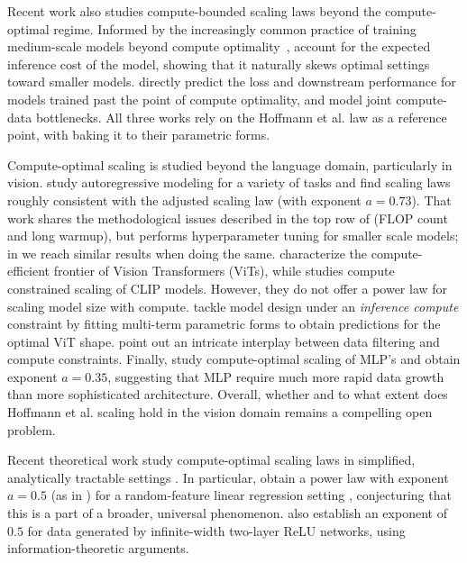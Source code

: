 \documentclass{article}
\makeatletter
\theoremstyle{plain}
\theoremstyle{definition}
\theoremstyle{remark}
\newcommand{\Hoffmann}{Hoffmann et al.\@\xspace}
\newcommand{\nExp}{a}
\makeatother
\begin{document}
{Recent work also studies compute-bounded scaling laws beyond the compute-optimal regime. Informed by the increasingly common practice of training medium-scale models beyond compute optimality~\citep[e.g., ][]{touvron2023llama,touvron2023llama2,jiang2023mistral}, \citet{sardana2023beyond} account for the expected inference cost of the model, showing that it naturally skews optimal settings toward smaller models. \citet{gadre2024language} directly predict the loss and downstream performance for models trained past the point of compute optimality, and \citet{muennighoff2024scaling} model joint compute-data bottlenecks. All three works  rely on the \Hoffmann law as a reference point, with \cite{gadre2024language,muennighoff2024scaling} baking it to their parametric forms. 

Compute-optimal scaling is studied beyond the language domain, particularly in vision. \citet{henighan2020scaling} study autoregressive modeling for a variety of tasks and find scaling laws roughly consistent with the \citet{kaplan2020scaling} adjusted scaling law (with exponent $\nExp=0.73$). That work shares the methodological issues described in the top row of  (FLOP count and long warmup), but performs hyperparameter tuning for smaller scale models; in  we reach similar results when doing the same. \citet{zhai2022scaling} characterize the compute-efficient frontier of Vision Transformers (ViTs), while \citet{cherti2023reproducible} studies compute constrained scaling of CLIP models. However, they do not offer a power law for scaling model size with compute. \citet{alabdulmohsin2023getting} tackle model design under an \emph{inference compute} constraint by fitting multi-term parametric forms to obtain predictions for the optimal ViT shape. 
\citet{goyal2024scaling} point out an intricate interplay between data filtering and compute constraints. Finally, \citet{bachmann2024scaling} study compute-optimal scaling of MLP's and obtain exponent $\nExp=\num{0.35}$, suggesting that MLP require much more rapid data growth than more sophisticated architecture. Overall, whether and to what extent does \Hoffmann scaling hold in the vision domain remains a compelling open problem.  

Recent theoretical work study compute-optimal scaling laws in simplified, analytically tractable settings \cite{bordelon2024dynamical,lin2024scaling,paquette2024four,jeon2024information}. In particular, \citet{paquette2024four} obtain a power law with exponent $a=0.5$ (as in \citet{hoffmann2022empirical}) for a random-feature linear regression setting \cite{maloney2022solvable,atanaso2023onset}, conjecturing that this is a part of a broader, universal phenomenon. \citet{jeon2024information} also establish an exponent of $0.5$  for data generated by infinite-width two-layer ReLU networks, using information-theoretic arguments. 

}
\end{document}
